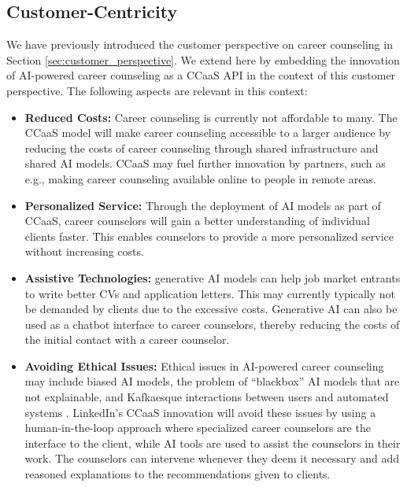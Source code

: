\subsection{Customer-Centricity}

We have previously introduced the customer perspective on career counseling in Section \ref{sec:customer_perspective}.
We extend here by embedding the innovation of AI-powered career counseling as a CCaaS API in the context of this 
customer perspective. The following aspects are relevant in this context:

\begin{itemize}
    \item \textbf{Reduced Costs:} Career counseling is currently not affordable to many. The CCaaS model
        will make career counseling accessible to a larger audience by reducing the costs of career
        counseling through shared infrastructure and shared AI models. CCaaS may fuel further innovation by 
        partners, such as e.g., making career counseling available online to people in remote areas.
    \item \textbf{Personalized Service:} Through the deployment of AI models as part of CCaaS, career counselors 
        will gain a better understanding of individual clients faster. This enables counselors to provide
        a more personalized service without increasing costs.
    \item \textbf{Assistive Technologies:} generative AI models can help job market entrants to write better CVs
        and application letters. This may currently typically not be demanded by clients due to the excessive costs.
        Generative AI can also be used as a chatbot interface to career counselors, thereby reducing the costs
        of the initial contact with a career counselor.
    \item \textbf{Avoiding Ethical Issues:} Ethical issues in AI-powered career counseling may include biased AI
        models, the problem of ``blackbox'' AI models that are not explainable, and Kafkaesque interactions between
        users and automated systems \citep{kaserAIpoweredCareerCounseling2023}. LinkedIn's CCaaS innovation will avoid 
        these issues by using a human-in-the-loop approach where specialized career counselors are the interface 
        to the client, while AI tools are used to assist the counselors in their work. The counselors can intervene
        whenever they deem it necessary and add reasoned explanations to the recommendations given to clients.
\end{itemize}

